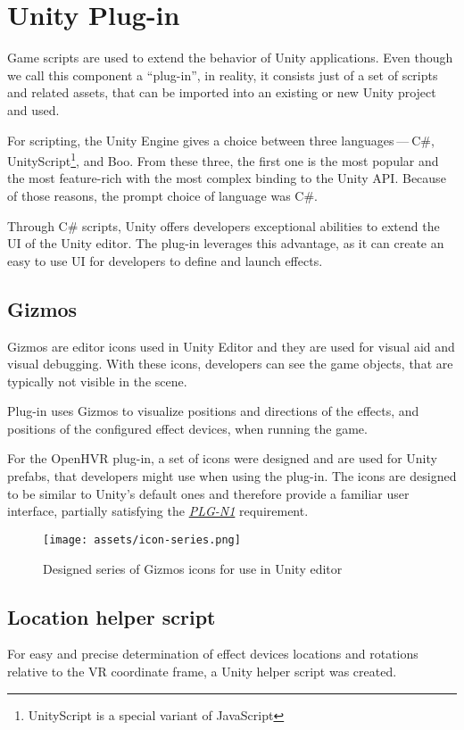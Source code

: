 \hypertarget{x-unity-plug-in}{\section{Unity Plug-in}}
Game scripts are used to extend the behavior of Unity applications. Even though
we call this component a ``plug-in'', in reality, it consists just of a
set of scripts and related assets, that can be imported into an existing
or new Unity project and used.


For scripting, the Unity Engine gives a choice between three languages — C\#, 
UnityScript\footnote{UnityScript is a special variant of JavaScript}, and
Boo. From these three, the first one is the most popular and the most
feature-rich with the most complex binding to the Unity API. \cite{unityblog}
Because of those reasons, the prompt choice of language was C\#.


Through C\# scripts, Unity offers developers exceptional abilities to extend
the UI of the Unity editor. The plug-in leverages this advantage, as it can
create an easy to use UI for developers to define and launch effects.


\hypertarget{x-gizmos}{\subsection{Gizmos}}
Gizmos are editor icons used in Unity Editor and they are used for
visual aid and visual debugging. \cite{gizmos}
With these icons, developers can see the game objects, that are
typically not visible in the scene.


Plug-in uses Gizmos to visualize positions and directions of the
effects, and positions of the configured effect devices, when running the game.


For the OpenHVR plug-in, a set of icons were designed and are used for
Unity prefabs, that developers might use when using the plug-in. The icons
are designed to be similar to Unity’s default ones and therefore provide
a familiar user interface, partially satisfying the 
\hyperlink{plg-n1}{\textit{PLG-N1}} requirement.


\begin{figure}[h]{}
\centering\texttt{[image: assets/icon-series.png]}
\caption{Designed series of Gizmos icons for use in Unity editor}

\end{figure}

\hypertarget{x-location-helper-script}{\subsection{Location helper script}}
For easy and precise determination of effect devices locations and rotations
relative to the VR coordinate frame, a Unity helper script was created.


